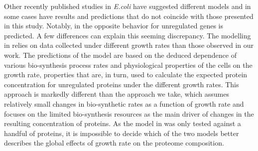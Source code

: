 Other recently published studies in \emph{E.coli} have suggested different models and in some cases have results  and predictions that do not coincide with those presented in this study.
Notably, in \cite{Klumpp2009a} the opposite behavior for unregulated genes is predicted.
A few differences can explain this seeming discrepancy.
The modelling in \cite{Klumpp2009a} relies on data collected under different growth rates than those observed in our work.
The predictions of the model are based on the deduced dependence of various bio-synthesis process rates and physiological properties of the cells on the growth rate, properties that are, in turn, used to calculate the expected protein concentration for unregulated proteins under the different growth rates.
This approach is markedly different than the approach we take, which assumes relatively small changes in bio-synthetic rates as a function of growth rate and focuses on the limited bio-synthesis resources as the main driver of changes in the resulting concentration of proteins.
As the model in \cite{Klumpp2009a} was only tested against a handful of proteins, it is impossible to decide which of the two models better describes the global effects of growth rate on the proteome composition.